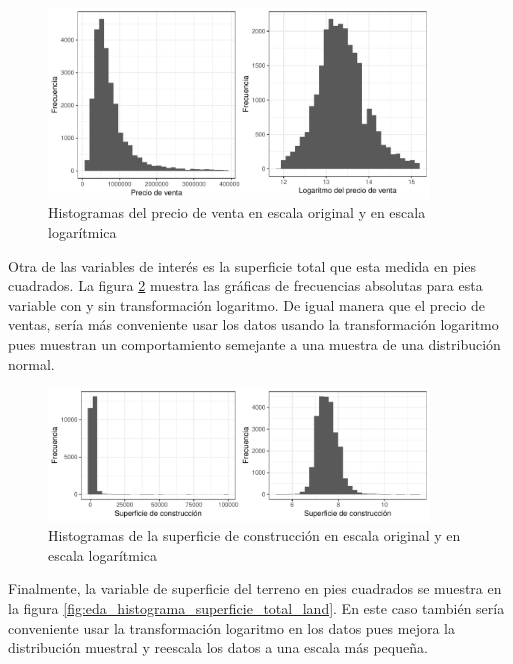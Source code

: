 \begin{figure}[H]
    \centering
    \includegraphics[width=0.9\textwidth]{images/eda_histograma_precio_venta.pdf}
    \caption{Histogramas del precio de venta en escala original y en escala logarítmica}
    \label{fig:eda_histograma_precio_venta}
\end{figure}


Otra de las variables de interés es la superficie total que esta medida en pies cuadrados. La figura \ref{fig:eda_histograma_superficie} muestra las gráficas de frecuencias absolutas para esta variable con y sin transformación logaritmo. De igual manera que el precio de ventas, sería más conveniente usar los datos usando la transformación logaritmo pues muestran un comportamiento semejante a una muestra de una distribución normal.

\begin{figure}[H]
    \centering
    \includegraphics[width=0.9\textwidth]{images/eda_histograma_superficie.pdf}
    \caption{Histogramas de la superficie de construcción en escala original y en escala logarítmica}
    \label{fig:eda_histograma_superficie}
\end{figure}


Finalmente, la variable de superficie del terreno en pies cuadrados se muestra en la figura \ref{fig:eda_histograma_superficie_total_land}. En este caso también sería conveniente usar la transformación logaritmo en los datos pues mejora la distribución muestral y reescala los datos a una escala más pequeña.

